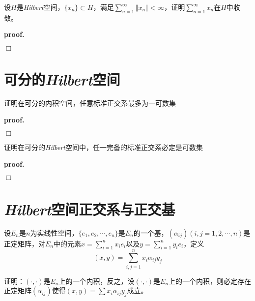 \begin{mdframed}
    \begin{question}
        设$H$是\textsl{Hilbert}空间，$\{x_n\}\subset H$，满足$\sum_{n=1}^{\infty}\Vert x_n\Vert<\infty$，证明$\sum_{n=1}^{\infty}x_n$在$H$中收敛。
    \end{question}
\end{mdframed}

\textbf{proof.}

$\Box$

\section{可分的\textsl{Hilbert}空间}

\begin{mdframed}
    \begin{question}
        证明在可分的内积空间，任意标准正交系最多为一可数集
    \end{question}
\end{mdframed}

\textbf{proof.}

$\Box$

\begin{mdframed}
    \begin{question}
        证明在可分的\textsl{Hilbert}空间中，任一完备的标准正交系必定是可数集
    \end{question}
\end{mdframed}

\textbf{proof.}

$\Box$

\section{\textsl{Hilbert}空间正交系与正交基}

\begin{mdframed}
    \begin{question}
        设$E_n$是$n$为实线性空间，$\{e_1,e_2,\cdots,e_n\}$是$E_n$的一个基，$(\alpha_{ij})(i,j=1,2,\cdots,n)$是正定矩阵，对$E_n$中的元素$x=\sum\limits_{i=1}^{n}x_ie_i$以及$y=\sum\limits_{i=1}^{n}y_ie_i$，定义
        \begin{equation}
            (x,y)=\sum_{i,j=1}^{n}x_i\alpha_{ij}y_j
        \end{equation}

        证明：$(\cdot,\cdot)$是$E_n$上的一个内积，反之，设$(\cdot,\cdot)$是$E_n$上的一个内积，则必定存在正定矩阵$(\alpha_{ij})$使得$(x,y)=\sum x_i\alpha_{ij} y_j$成立。
    \end{question}
\end{mdframed}

